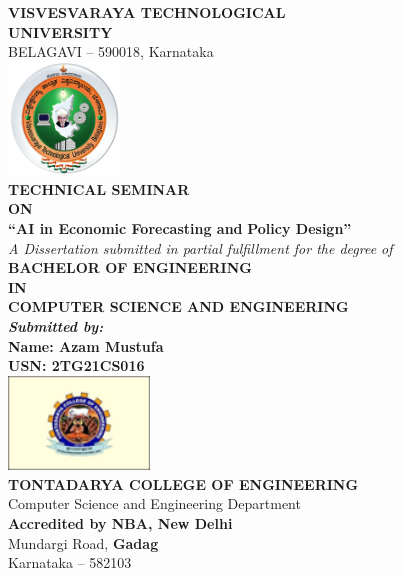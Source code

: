 \begin{titlepage}
    \centering

    {\LARGE \bfseries VISVESVARAYA TECHNOLOGICAL}\\[0.2cm]
    {\LARGE \bfseries UNIVERSITY}\\[0.2cm]
    {\large BELAGAVI – 590018, Karnataka}\\[1cm]

    \includegraphics[height=3cm]{../images/vtu.png}\\[1cm]

    {\Large \bfseries TECHNICAL SEMINAR}\\[0.3cm]
    {\large \bfseries ON}\\[0.3cm]

    {\LARGE \bfseries ``AI in Economic Forecasting and}
    {\LARGE \bfseries Policy Design''}\\[0.3cm]

    {\itshape A Dissertation submitted in partial fulfillment for the degree of}\\[0.2cm]

    {\large \bfseries BACHELOR OF ENGINEERING}\\
    {\large \bfseries IN}\\
    {\large \bfseries COMPUTER SCIENCE AND ENGINEERING}\\[1cm]

    \textbf{\textit{Submitted by:}}\\[0.2cm]
    \textbf{Name: Azam Mustufa}\\
    \textbf{USN: 2TG21CS016}\\[0.8cm]

    \includegraphics[height=2.5cm]{../images/tce.png}\\[1cm]

    {\bfseries TONTADARYA COLLEGE OF ENGINEERING}\\
    Computer Science and Engineering Department\\[0.3cm]

    \textbf{Accredited by NBA, New Delhi}\\
    Mundargi Road, \textbf{Gadag}\\
    Karnataka – 582103

\end{titlepage}